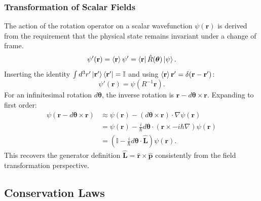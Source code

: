 \subsubsection{Transformation of Scalar Fields}
The action of the rotation operator on a scalar wavefunction $\psi(\mathbf{r})$
is derived from the requirement that the physical state remains invariant under
a change of frame.
\begin{equation}
  \psi'(\mathbf{r}) = \braket{\mathbf{r}}{\psi'} = \bra{\mathbf{r}}
  \hat{R}(\boldsymbol{\theta}) \ket{\psi}.
\end{equation}
Inserting the identity $\int d^3r' \ket{\mathbf{r}'}\bra{\mathbf{r}'} =
\mathbb{I}$ and using $\braket{\mathbf{r}}{\mathbf{r}'} =
\delta(\mathbf{r}-\mathbf{r}')$:
\begin{equation}
  \psi'(\mathbf{r}) = \psi(R^{-1}\mathbf{r}).
\end{equation}
For an infinitesimal rotation $d\boldsymbol{\theta}$, the inverse rotation is
$\mathbf{r} - d\boldsymbol{\theta} \times \mathbf{r}$. Expanding to first order:
\begin{align}
  \psi(\mathbf{r} - d\boldsymbol{\theta} \times \mathbf{r}) &\approx
  \psi(\mathbf{r}) - (d\boldsymbol{\theta} \times \mathbf{r}) \cdot \nabla
  \psi(\mathbf{r}) \nonumber \\
                                                            &= \psi(\mathbf{r}) - \frac{i}{\hbar} d\boldsymbol{\theta} \cdot (\mathbf{r}
                                                            \times -i\hbar\nabla) \psi(\mathbf{r}) \nonumber \\
                                                            &= \left( \mathbb{I} - \frac{i}{\hbar} d\boldsymbol{\theta} \cdot
                                                            \hat{\mathbf{L}} \right) \psi(\mathbf{r}).
\end{align}
This recovers the generator definition $\hat{\mathbf{L}} = \hat{\mathbf{r}}
\times \hat{\mathbf{p}}$ consistently from the field transformation perspective.

\subsection{Conservation Laws}

